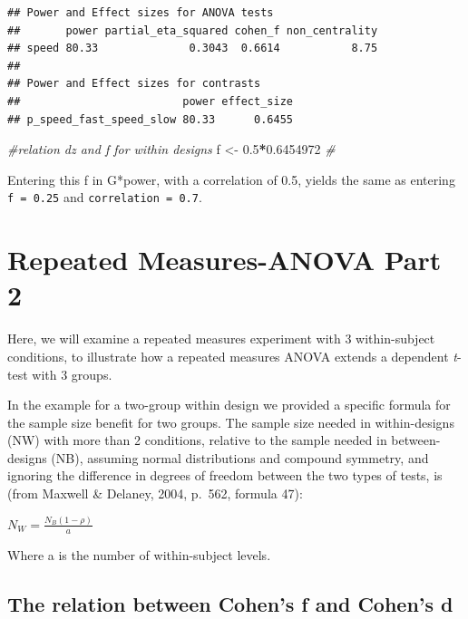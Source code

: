 \documentclass[]{book}
\newenvironment{Shaded}{\begin{snugshade}}{\end{snugshade}}
\newcommand{\CommentTok}[1]{\textcolor[rgb]{0.56,0.35,0.01}{\textit{#1}}}
\newcommand{\FloatTok}[1]{\textcolor[rgb]{0.00,0.00,0.81}{#1}}
\newcommand{\NormalTok}[1]{#1}
\newcommand{\OperatorTok}[1]{\textcolor[rgb]{0.81,0.36,0.00}{\textbf{#1}}}
\newcommand{\StringTok}[1]{\textcolor[rgb]{0.31,0.60,0.02}{#1}}
\begin{document}
\begin{verbatim}
## Power and Effect sizes for ANOVA tests
##       power partial_eta_squared cohen_f non_centrality
## speed 80.33              0.3043  0.6614           8.75
## 
## Power and Effect sizes for contrasts
##                         power effect_size
## p_speed_fast_speed_slow 80.33      0.6455
\end{verbatim}

\begin{Shaded}
\begin{Highlighting}[]
\CommentTok{#relation dz and f for within designs }
\NormalTok{f <-}\StringTok{ }\FloatTok{0.5}\OperatorTok{*}\FloatTok{0.6454972}
\CommentTok{#  }
\end{Highlighting}
\end{Shaded}

Entering this f in G*power, with a correlation of 0.5, yields the same as entering \texttt{f\ =\ 0.25} and \texttt{correlation\ =\ 0.7}.

\hypertarget{repeated-measures-anova-part-2}{%
\section{Repeated Measures-ANOVA Part 2}\label{repeated-measures-anova-part-2}}

Here, we will examine a repeated measures experiment with 3 within-subject conditions, to illustrate how a repeated measures ANOVA extends a dependent \emph{t}-test with 3 groups.

In the example for a two-group within design we provided a specific formula for the sample size benefit for two groups. The sample size needed in within-designs (NW) with more than 2 conditions, relative to the sample needed in between-designs (NB), assuming normal distributions and compound symmetry, and ignoring the difference in degrees of freedom between the two types of tests, is (from Maxwell \& Delaney, 2004, p.~562, formula 47):

\(N_{W}=\frac{N_{B}(1-\rho)}{a}\)

Where a is the number of within-subject levels.

\hypertarget{the-relation-between-cohens-f-and-cohens-d}{%
\subsection{The relation between Cohen's f and Cohen's d}\label{the-relation-between-cohens-f-and-cohens-d}}
\end{document}
